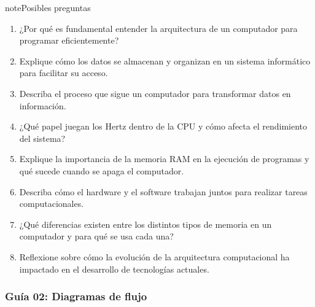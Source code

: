 \documentclass[letterpaper,10pt,spanish]{sphinxmanual}
\begin{document}
\begin{sphinxadmonition}{note}{Posibles preguntas}
\begin{enumerate}
\item {} 
\sphinxAtStartPar
¿Por qué es fundamental entender la arquitectura de un computador para programar eficientemente?

\item {} 
\sphinxAtStartPar
Explique cómo los datos se almacenan y organizan en un sistema informático para facilitar su acceso.

\item {} 
\sphinxAtStartPar
Describa el proceso que sigue un computador para transformar datos en información.

\item {} 
\sphinxAtStartPar
¿Qué papel juegan los Hertz dentro de la CPU y cómo afecta el rendimiento del sistema?

\item {} 
\sphinxAtStartPar
Explique la importancia de la memoria RAM en la ejecución de programas y qué sucede cuando se apaga el computador.

\item {} 
\sphinxAtStartPar
Describa cómo el hardware y el software trabajan juntos para realizar tareas computacionales.

\item {} 
\sphinxAtStartPar
¿Qué diferencias existen entre los distintos tipos de memoria en un computador y para qué se usa cada una?

\item {} 
\sphinxAtStartPar
Reflexione sobre cómo la evolución de la arquitectura computacional ha impactado en el desarrollo de tecnologías actuales.

\end{enumerate}
\end{sphinxadmonition}

\sphinxstepscope


\subsubsection{Guía 02: Diagramas de flujo}
\label{\detokenize{cursos/ofimatica11/periodo01/G02:guia-02-diagramas-de-flujo}}\label{\detokenize{cursos/ofimatica11/periodo01/G02::doc}}
\end{document}
